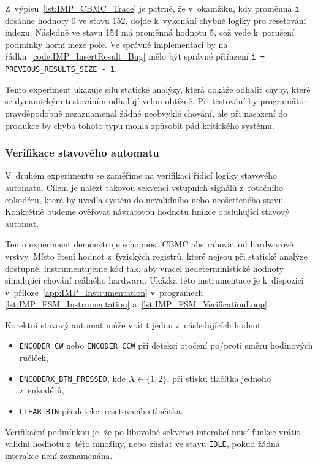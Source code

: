 \documentclass[a4paper, 11pt]{article}
\begin{document}
Z~výpisu~\ref{lst:IMP_CBMC_Trace} je patrné, že v~okamžiku, kdy proměnná \texttt{i} dosáhne hodnoty 0 ve stavu 152, dojde k~vykonání chybné logiky pro resetování indexu.
Následně ve stavu 154 má proměnná hodnotu 5, což vede k~porušení podmínky horní meze pole.
Ve správné implementaci by na řádku~\ref{code:IMP_InsertResult_Bug} mělo být správné přiřazení \texttt{i = PREVIOUS\_RESULTS\_SIZE - 1}.

Tento experiment ukazuje sílu statické analýzy, která dokáže odhalit chyby, které se dynamickým testováním odhalují velmi obtížně.
Při testování by programátor pravděpodobně nezaznamenal žádné neobvyklé chování, ale při nasazení do produkce by chyba tohoto typu mohla způsobit pád kritického systému.

\subsubsection{Verifikace stavového automatu}
V~druhém experimentu se zaměříme na verifikaci řídicí logiky stavového automatu.
Cílem je nalézt takovou sekvenci vstupních signálů z~rotačního enkodéru, která by uvedla systém do nevalidního nebo neošetřeného stavu.
Konkrétně budeme ověřovat návratovou hodnotu funkce obsluhující stavový automat. 

Tento experiment demonstruje schopnost CBMC abstrahovat od hardwarové vrstvy.
Místo čtení hodnot z~fyzických registrů, které nejsou při statické analýze dostupné, instrumentujeme kód tak, aby vracel nedeterministické hodnoty simulující chování reálného hardwaru.
Ukázka této instrumentace je k~dispozici v~příloze~\ref{app:IMP_Instrumentation} v~programech \ref{lst:IMP_FSM_Instrumentation} a~\ref{lst:IMP_FSM_VerificationLoop}.

Korektní stavový automat může vrátit jednu z~následujících hodnot:
\begin{itemize}
    \item \texttt{ENCODER\_CW} nebo \texttt{ENCODER\_CCW} při detekci otočení po/proti směru hodinových ručiček,
    \item \texttt{ENCODERX\_BTN\_PRESSED}, kde $X \in \{1, 2\}$, při stisku tlačítka jednoho z~enkodérů,
    \item \texttt{CLEAR\_BTN} při detekci resetovacího tlačítka.
\end{itemize}
Verifikační podmínkou je, že po libovolné sekvenci interakcí musí funkce vrátit validní hodnotu z~této množiny, nebo zůstat ve stavu \texttt{IDLE}, pokud žádná interakce není zaznamenána.
\end{document}

